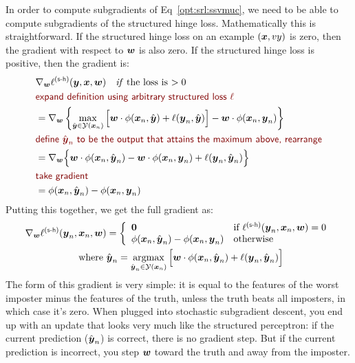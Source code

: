 In order to compute subgradients of Eq~\eqref{opt:srl:ssvmuc}, we need to be able to compute subgradients of the structured hinge loss.
Mathematically this is straightforward.
If the structured hinge loss on an example $({\boldsymbol{x}},vy)$ is zero, then the gradient with respect to ${\boldsymbol{w}}$ is also zero.
If the structured hinge loss is positive, then the gradient is:
\begin{align}
  &\grad_{\vw} \ell\xth{s-h}(\vy, \vx, \vw) \quad\text{\emph{if} the loss is $>0$}\\
  \becauseoffull{expand definition using arbitrary structured loss $\ell$} \\
  &= \grad_{\vw} \left\{
    \max_{\hat\vy \in \cY(\vx_n)} \Big[ \dotp{\vw}{\phi(\vx_n,\hat\vy)} + \ell(\vy_n, \hat\vy) \Big] - \dotp{\vw}{\phi(\vx_n,\vy_n)} \right\} \\
  \becauseoffull{define $\hat\vy_n$ to be the output that attains the maximum above, rearrange} \\
  &= \grad_{\vw} \Big\{ \dotp{\vw}{\phi(\vx_n,\hat\vy_n)} - \dotp{\vw}{\phi(\vx_n,\vy_n)} + \ell(\vy_n, \hat\vy_n) \Big\} \\
  \becauseoffull{take gradient} \\
  &= \phi(\vx_n,\hat\vy_n) - \phi(\vx_n,\vy_n)
\end{align}
Putting this together, we get the full gradient as:
\begin{align}
\grad_{\vw} \ell\xth{s-h}(\vy_n, \vx_n, \vw)
  &= \brack{ \vec 0 & \text{if } \ell\xth{s-h}(\vy_n, \vx_n, \vw) = 0 \\
             \phi(\vx_n,\hat\vy_n) - \phi(\vx_n,\vy_n) & \text{otherwise} } \nonumber\\
\text{where } &
 \hat\vy_n =
\argmax_{\hat\vy_n \in \cY(\vx_n)} \Big[ \dotp{\vw}{\phi(\vx_n,\hat\vy_n)} + \ell(\vy_n, \hat\vy_n) \Big] \label{eq:srl:lossaug}
\end{align}
The form of this gradient is very simple: it is equal to the features of the worst imposter minus the features of the truth, unless the truth beats all imposters, in which case it's zero.
When plugged into stochastic subgradient descent, you end up with an update that looks very much like the structured perceptron: if the current prediction ($\hat{{\boldsymbol{y}}}_n$) is correct, there is no gradient step. But if the current prediction is incorrect, you step ${\boldsymbol{w}}$ toward the truth and away from the imposter.

